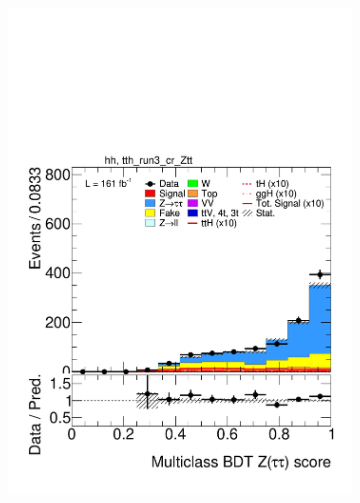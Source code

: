 \begin{figure}[htbp]
  \begin{subfigure}[b]{0.49\textwidth}
    \centering
    \includegraphics[width=\textwidth]{images/plots_modelling_run2_run3_variables/run_3_tth/plot_tth_th_multiclass_Z_hh_tth_run3_cr_Ztt_22_23_24.pdf}
    \caption{}


\end{subfigure}
\end{figure}
